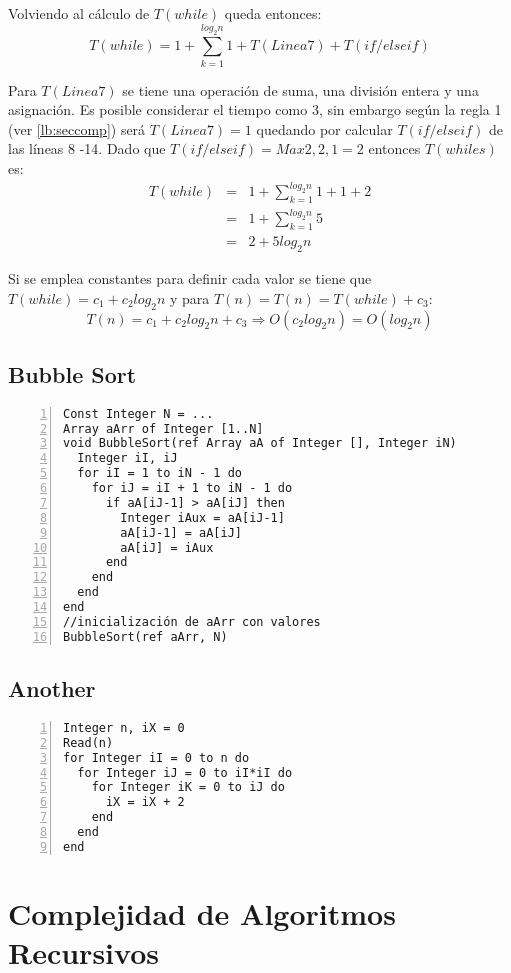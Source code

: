 Volviendo al cálculo de $T(while)$ queda entonces:
$$T(while) = 1 + \sum_{k=1}^{log_2n}{1 + T(Linea 7) + T(if/elseif)}$$

Para $T(Linea 7)$ se tiene una operación de suma, una división entera y una asignación. Es posible considerar el tiempo como 3, sin embargo según la regla 1 (ver \ref{lb:seccomp}) será $T(Linea 7) = 1$ quedando por calcular $T(if/elseif)$ de las líneas 8 -14. Dado que $T(if/elseif) = Max{2, 2, 1} = 2$ entonces $T(whiles)$ es:
\begin{eqnarray*}
T(while)&=&1 + \sum_{k=1}^{log_2n}{1 + 1 + 2}\\
&=&1 + \sum_{k=1}^{log_2n}{5}\\
&=&2 + 5 log_2n
\end{eqnarray*}

Si se emplea constantes para definir cada valor se tiene que $T(while) = c_1 + c_2 log_2n$ y para $T(n) = T(n) = T(while) + c_3$:
$$T(n) = c_1 + c_2 log_2n + c_3 \Rightarrow O(c_2 log_2n) = O(log_2n)$$

\subsection{Bubble Sort}
\begin{lstlisting}[upquote=true, language=pseudo, numbers=left]
Const Integer N = ...
Array aArr of Integer [1..N]
void BubbleSort(ref Array aA of Integer [], Integer iN)
  Integer iI, iJ
  for iI = 1 to iN - 1 do
    for iJ = iI + 1 to iN - 1 do
      if aA[iJ-1] > aA[iJ] then
        Integer iAux = aA[iJ-1]
        aA[iJ-1] = aA[iJ]
        aA[iJ] = iAux
      end
    end
  end
end
//inicialización de aArr con valores
BubbleSort(ref aArr, N)
\end{lstlisting}



\subsection{Another}
\begin{lstlisting}[upquote=true, language=pseudo, numbers=left]
Integer n, iX = 0
Read(n)
for Integer iI = 0 to n do
  for Integer iJ = 0 to iI*iI do
    for Integer iK = 0 to iJ do
      iX = iX + 2
    end
  end
end
\end{lstlisting}

\section{Complejidad de Algoritmos Recursivos}

